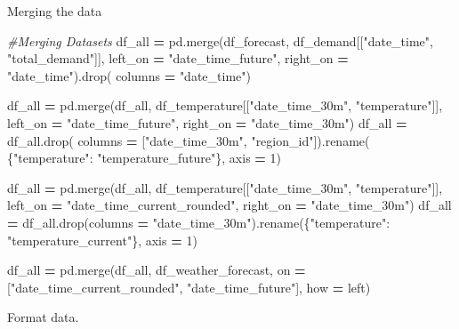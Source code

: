 \documentclass[mstat,12pt]{unswthesis}
\newenvironment{Shaded}{\begin{snugshade}}{\end{snugshade}}
\newcommand{\CommentTok}[1]{\textcolor[rgb]{0.56,0.35,0.01}{\textit{#1}}}
\newcommand{\DecValTok}[1]{\textcolor[rgb]{0.00,0.00,0.81}{#1}}
\newcommand{\NormalTok}[1]{#1}
\newcommand{\OperatorTok}[1]{\textcolor[rgb]{0.81,0.36,0.00}{\textbf{#1}}}
\newcommand{\StringTok}[1]{\textcolor[rgb]{0.31,0.60,0.02}{#1}}
\begin{document}
Merging the data

\begin{Shaded}
\begin{Highlighting}[]
\CommentTok{\#Merging Datasets}
\NormalTok{df\_all }\OperatorTok{=}\NormalTok{ pd.merge(df\_forecast, df\_demand[[}\StringTok{"date\_time"}\NormalTok{, }\StringTok{"total\_demand"}\NormalTok{]], }
\NormalTok{    left\_on }\OperatorTok{=} \StringTok{"date\_time\_future"}\NormalTok{, right\_on }\OperatorTok{=} \StringTok{"date\_time"}\NormalTok{).drop(}
\NormalTok{        columns }\OperatorTok{=} \StringTok{"date\_time"}\NormalTok{)}

\NormalTok{df\_all }\OperatorTok{=}\NormalTok{ pd.merge(df\_all, }
\NormalTok{    df\_temperature[[}\StringTok{"date\_time\_30m"}\NormalTok{, }\StringTok{"temperature"}\NormalTok{]], }
\NormalTok{        left\_on }\OperatorTok{=} \StringTok{"date\_time\_future"}\NormalTok{, right\_on }\OperatorTok{=} \StringTok{"date\_time\_30m"}\NormalTok{)}
\NormalTok{df\_all }\OperatorTok{=}\NormalTok{ df\_all.drop(}
\NormalTok{    columns }\OperatorTok{=}\NormalTok{ [}\StringTok{"date\_time\_30m"}\NormalTok{, }\StringTok{"region\_id"}\NormalTok{]).rename(}
\NormalTok{        \{}\StringTok{"temperature"}\NormalTok{: }\StringTok{"temperature\_future"}\NormalTok{\}, axis }\OperatorTok{=} \DecValTok{1}\NormalTok{)}

\NormalTok{df\_all }\OperatorTok{=}\NormalTok{ pd.merge(df\_all, }
\NormalTok{    df\_temperature[[}\StringTok{"date\_time\_30m"}\NormalTok{, }\StringTok{"temperature"}\NormalTok{]], }
\NormalTok{    left\_on }\OperatorTok{=} \StringTok{"date\_time\_current\_rounded"}\NormalTok{, right\_on }\OperatorTok{=} \StringTok{"date\_time\_30m"}\NormalTok{)}
\NormalTok{df\_all }\OperatorTok{=}\NormalTok{ df\_all.drop(columns }\OperatorTok{=} 
    \StringTok{"date\_time\_30m"}\NormalTok{).rename(\{}\StringTok{"temperature"}\NormalTok{: }\StringTok{"temperature\_current"}\NormalTok{\}, }
\NormalTok{    axis }\OperatorTok{=} \DecValTok{1}\NormalTok{)}

\NormalTok{df\_all }\OperatorTok{=}\NormalTok{ pd.merge(df\_all, df\_weather\_forecast, on }\OperatorTok{=} 
\NormalTok{    [}\StringTok{"date\_time\_current\_rounded"}\NormalTok{, }\StringTok{"date\_time\_future"}\NormalTok{], how }\OperatorTok{=} \StringTok{\textquotesingle{}left\textquotesingle{}}\NormalTok{)}
\end{Highlighting}
\end{Shaded}

Format data.
\end{document}

